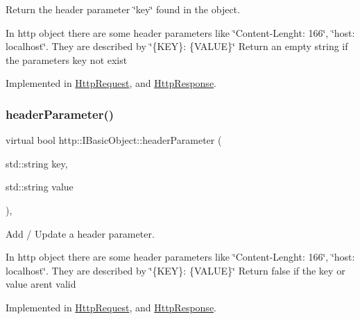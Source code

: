 Return the header parameter \char`\"{}key\char`\"{} found in the object. 

In http object there are some header parameters like \char`\"{}\+Content-\/\+Lenght\+: 166\char`\"{}, \char`\"{}host\+: localhost\char`\"{}. They are described by \char`\"{}\{\+K\+E\+Y\}\+: \{\+V\+A\+L\+U\+E\}\char`\"{} Return an empty string if the parameters key not exist 

Implemented in \hyperlink{classHttpRequest_a96f232879fff933182a3ed5c80229df6}{Http\+Request}, and \hyperlink{classHttpResponse_a257c44a876f78e131e32d5af9f81d4fc}{Http\+Response}.

\mbox{\label{structhttp_1_1IBasicObject_a0d1fff270c6069bedf87e86cdac6bf3d}} 
\subsubsection{\texorpdfstring{header\+Parameter()}{headerParameter()}\hspace{0.1cm}{\footnotesize\ttfamily [2/2]}}
{\footnotesize\ttfamily virtual bool http\+::\+I\+Basic\+Object\+::header\+Parameter (\begin{DoxyParamCaption}\item[{std\+::string}]{key,  }\item[{std\+::string}]{value }\end{DoxyParamCaption})\hspace{0.3cm}{\ttfamily [pure virtual]}, {\ttfamily [noexcept]}}



Add / Update a header parameter. 

In http object there are some header parameters like \char`\"{}\+Content-\/\+Lenght\+: 166\char`\"{}, \char`\"{}host\+: localhost\char`\"{}. They are described by \char`\"{}\{\+K\+E\+Y\}\+: \{\+V\+A\+L\+U\+E\}\char`\"{} Return false if the key or value aren\textquotesingle{}t valid 

Implemented in \hyperlink{classHttpRequest_a04f974104da7c06c568a8e648693e92c}{Http\+Request}, and \hyperlink{classHttpResponse_a193cf7b72bfedfc7f37318aff1d55158}{Http\+Response}.

\mbox{\label{structhttp_1_1IBasicObject_a581e48c03a666b87082c75427f0ff835}} 
